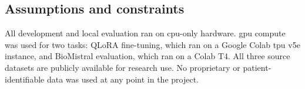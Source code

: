 \subsection{Assumptions and constraints}

All development and local evaluation ran on \ac{cpu}-only hardware. \ac{gpu} compute was used for two tasks: QLoRA fine-tuning, which ran on a Google Colab \ac{tpu} v5e instance, and BioMistral evaluation, which ran on a Colab T4. All three source datasets are publicly available for research use. No proprietary or patient-identifiable data was used at any point in the project.
